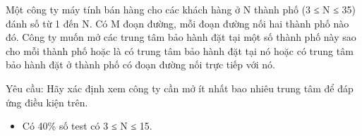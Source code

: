 Một công ty máy tính bán hàng cho các khách hàng ở N thành phố (3 ≤ N ≤ 35) đánh số từ 1 đến N. Có M đoạn đường, mỗi đoạn đường nối hai thành phố nào đó. Công ty muốn mở các trung tâm bảo hành đặt tại một số thành phố này sao cho mỗi thành phố hoặc là có trung tâm bảo hành đặt tại nó hoặc có trung tâm bảo hành đặt ở thành phố có đoạn đường nối trực tiếp với nó.  

   Yêu cầu: Hãy xác định xem công ty cần mở ít nhất bao nhiêu trung tâm để đáp ứng điều kiện trên.
\begin{itemize}
	\item     Có 40\% số test có 3 ≤ N ≤ 15.   
\end{itemize}
